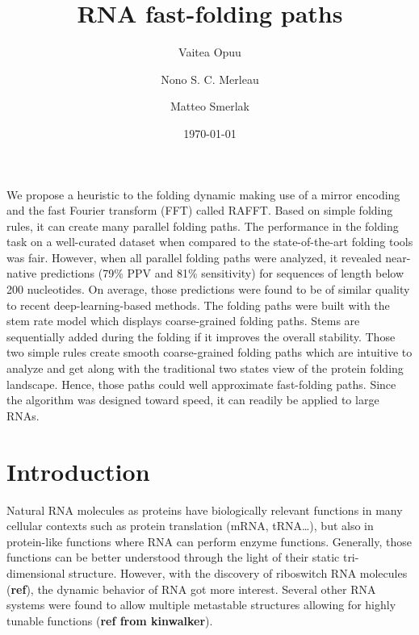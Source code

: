 \documentclass[a4paper,12pt]{article}
\author[]{Vaitea Opuu}
\author[]{Nono S. C. Merleau}
\author[]{Matteo Smerlak}
\affil[]{Max Planck Institute for Mathematics in the Sciences, D-04103 Leipzig, Germany}
\date{\today}
\title{RNA fast-folding paths}
\begin{document}
\maketitle
We propose a heuristic to the folding dynamic making use of a mirror encoding
and the fast Fourier transform (FFT) called RAFFT. Based on simple folding
rules, it can create many parallel folding paths. The performance in the folding
task on a well-curated dataset when compared to the state-of-the-art folding
tools was fair. However, when all parallel folding paths were analyzed, it
revealed near-native predictions (79\% PPV and 81\% sensitivity) for sequences of
length below 200 nucleotides. On average, those predictions were found to be of
similar quality to recent deep-learning-based methods. The folding paths were
built with the stem rate model which displays coarse-grained folding paths.
Stems are sequentially added during the folding if it improves the overall
stability. Those two simple rules create smooth coarse-grained folding paths
which are intuitive to analyze and get along with the traditional two states
view of the protein folding landscape. Hence, those paths could well approximate
fast-folding paths. Since the algorithm was designed toward speed, it can
readily be applied to large RNAs.

\section{Introduction}
\label{sec:orgf6a759d}
Natural RNA molecules as proteins have biologically relevant functions in many
cellular contexts such as protein translation (mRNA, tRNA\ldots{}), but also in
protein-like functions where RNA can perform enzyme functions. Generally, those
functions can be better understood through the light of their static
tri-dimensional structure. However, with the discovery of riboswitch RNA
molecules (\textbf{ref}), the dynamic behavior of RNA got more interest. Several other
RNA systems were found to allow multiple metastable structures allowing for
highly tunable functions (\textbf{ref from kinwalker}).
\end{document}
